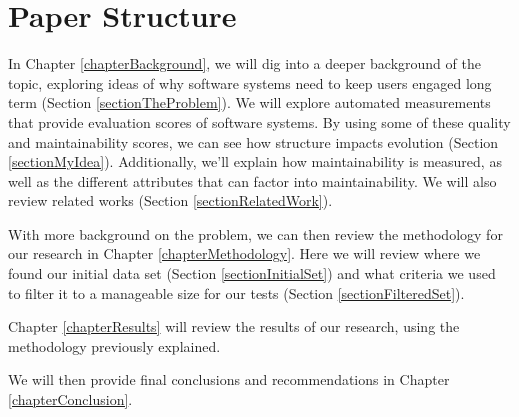 \section{Paper Structure}


In Chapter \ref{chapterBackground}, we will dig into a deeper background of the topic, exploring ideas of why software systems need to keep users engaged long term (Section \ref{sectionTheProblem}). We will explore automated measurements that provide evaluation scores of software systems. By using some of these quality and maintainability scores, we can see how structure impacts evolution (Section \ref{sectionMyIdea}). Additionally, we'll explain how maintainability is measured, as well as the different attributes that can factor into maintainability. We will also review related works (Section \ref{sectionRelatedWork}).


With more background on the problem, we can then review the methodology for our research in Chapter \ref{chapterMethodology}. Here we will review where we found our initial data set (Section \ref{sectionInitialSet}) and what criteria we used to filter it to a manageable size for our tests (Section \ref{sectionFilteredSet}).


Chapter \ref{chapterResults} will review the results of our research, using the methodology previously explained.


We will then provide final conclusions and recommendations in Chapter \ref{chapterConclusion}.
